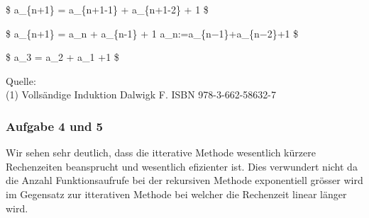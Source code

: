 \documentclass[11pt]{article}
\begin{document}
\$ a\_\{n+1\} = a\_\{n+1-1\} + a\_\{n+1-2\} + 1 \$

\$ a\_\{n+1\} = a\_n + a\_\{n-1\} + 1
\Longleftrightarrow a\_n:=a\_\{n−1\}+a\_\{n−2\}+1 \square \$

\$ a\_3 = a\_2 + a\_1 +1 \$

Quelle:\\
(1) Vollsändige Induktion Dalwigk F. ISBN 978-3-662-58632-7

\subsubsection{Aufgabe 4 und 5}\label{aufgabe-4-und-5}

Wir sehen sehr deutlich, dass die itterative Methode wesentlich kürzere
Rechenzeiten beansprucht und wesentlich efizienter ist. Dies verwundert
nicht da die Anzahl Funktionsaufrufe bei der rekursiven Methode
exponentiell grösser wird im Gegensatz zur itterativen Methode bei
welcher die Rechenzeit linear länger wird.


    
    
    
    
\end{document}
